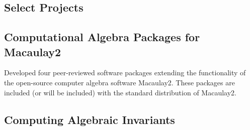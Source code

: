 \documentclass[
	10pt, %
]{FreemanCV}
\begin{document}
\begin{paracol}{2}

%
%
%
%
%	
%	
%	
%	
%	
%	


\section{Select Projects}

\subsection{Computational Algebra Packages for Macaulay2}

Developed four peer-reviewed software packages extending the functionality of the open-source computer algebra software Macaulay2. These packages are  included (or will be included) with the standard distribution of Macaulay2. 

\subsection{Computing Algebraic Invariants }


\end{paracol}
\end{document}
